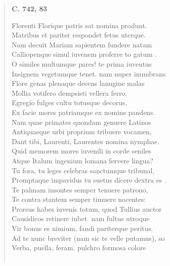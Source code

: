 \documentclass[11pt, a4paper]{report}
\begin{document}
\begin{verse}
     \marginpar{[226]} \begin{center} \textbf{C. 742, 83} \end{center}Florenti Florique patris sat nomina produnt. \\ Matribus et pariter respondet fetus uterque. \\ Nam decuit Mariam sapientem fundere  \lbrack natam \rbrack  \\ Calliopenque simul iuvenem proferre to \lbrack gatum \rbrack . \\ O similes multumque pares! te prima iuventus \\ Insignem vegetumque tenet. nam nuper  \lbrack inumbrans \rbrack  \\ Flore genas plenaque decens lanugine malas \\ Mollia votifero dempsisti vellera ferro. \\ Egregio fulges cultu totusque decorus, \\ Ex facie mores patriamque ex nomine pandens. \\ Nam quae primates quondam genuere Latinos \\ Antiquaeque urbi proprium tribuere vocamen, \\ Dant tibi, Laurenti, Laurentes nomina nymphae. \\ Quid memorem mores iuvenili in corde seniles \\ Atque Italum ingenium lomana fervere lingua? \\ Tu fora, tu leges celebras sanctumque tribunal, \\ Promptaque impavidus tu suetus dicere dextra  \lbrack es \rbrack . \\ Te palmam insontes semper tenuere patrono, \\ Te contra stantem semper timuere nocentes: \\ Prorsus habes iuvenis totum, quod Tullius auctor \\ Causidicos retinere iubet. nam fultus utroque \\ Vir bonus es nimium, fandi pariterque peritus. \\ Ad te nunc breviter (nam sic te velle putamus), so \\ Verba, puella, feram. pulchro formosa colore \\ 
        ﻿\pagebreak 

\end{verse}
\end{document}
